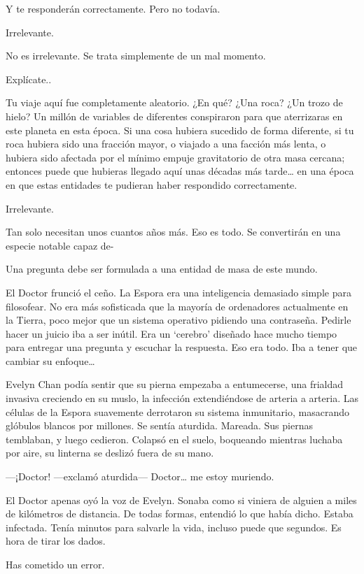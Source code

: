 Y te responderán correctamente. Pero no todavía.

Irrelevante.

No es irrelevante. Se trata simplemente de un mal momento.

Explícate..

Tu viaje aquí fue completamente aleatorio. ¿En qué? ¿Una roca? ¿Un trozo
de hielo? Un millón de variables de diferentes conspiraron para que
aterrizaras en este planeta en esta época. Si una cosa hubiera sucedido
de forma diferente, si tu roca hubiera sido una fracción mayor, o
viajado a una facción más lenta, o hubiera sido afectada por el mínimo
empuje gravitatorio de otra masa cercana; entonces puede que hubieras
llegado aquí unas décadas más tarde\ldots{} en una época en que estas
entidades te pudieran haber respondido correctamente.

Irrelevante.

Tan solo necesitan unos cuantos años más. Eso es todo. Se convertirán en
una especie notable capaz de-

Una pregunta debe ser formulada a una entidad de masa de este mundo.

El Doctor frunció el ceño. La Espora era una inteligencia demasiado
simple para filosofear. No era más sofisticada que la mayoría de
ordenadores actualmente en la Tierra, poco mejor que un sistema
operativo pidiendo una contraseña. Pedirle hacer un juicio iba a ser
inútil. Era un `cerebro' diseñado hace mucho tiempo para entregar una
pregunta y escuchar la respuesta. Eso era todo. Iba a tener que cambiar
su enfoque\ldots{}

Evelyn Chan podía sentir que su pierna empezaba a entumecerse, una
frialdad invasiva creciendo en su muslo, la infección extendiéndose de
arteria a arteria. Las células de la Espora suavemente derrotaron su
sistema inmunitario, masacrando glóbulos blancos por millones. Se sentía
aturdida. Mareada. Sus piernas temblaban, y luego cedieron. Colapsó en
el suelo, boqueando mientras luchaba por aire, su linterna se deslizó
fuera de su mano.

---¡Doctor! ---exclamó aturdida--- Doctor\ldots{} me estoy muriendo.

El Doctor apenas oyó la voz de Evelyn. Sonaba como si viniera de alguien
a miles de kilómetros de distancia. De todas formas, entendió lo que
había dicho. Estaba infectada. Tenía minutos para salvarle la vida,
incluso puede que segundos. Es hora de tirar los dados.

Has cometido un error.

